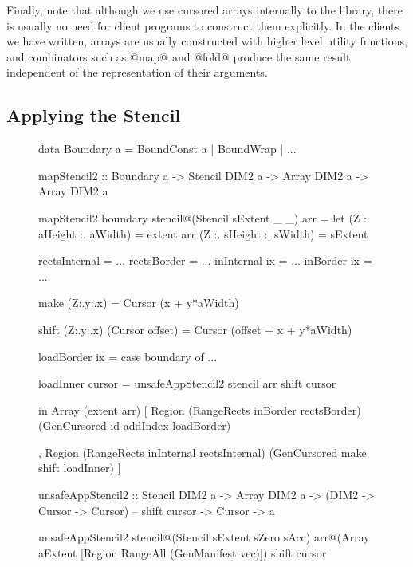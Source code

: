 Finally, note that although we use cursored arrays internally to the library, there is usually no need for client programs to construct them explicitly. In the clients we have written, arrays are usually constructed with higher level utility functions, and combinators such as @map@ and @fold@ produce the same result independent of the representation of their arguments.

\subsection{Applying the Stencil}
\label{sec:ApplyingTheStencil}

\begin{figure}

\begin{small}
\begin{code}
data Boundary a
      = BoundConst a
      | BoundWrap
      | ...
	
mapStencil2 
  :: Boundary a -> Stencil DIM2 a
  -> Array DIM2 a -> Array DIM2 a

mapStencil2 boundary stencil@(Stencil sExtent _ _) arr
 = let (Z :. aHeight :. aWidth) = extent arr
       (Z :. sHeight :. sWidth) = sExtent

       rectsInternal    = ...
       rectsBorder      = ...
       inInternal ix    = ...
       inBorder   ix    = ...

       make  (Z:.y:.x)
        = Cursor (x + y*aWidth)
	
       shift (Z:.y:.x) (Cursor offset)
        = Cursor (offset + x + y*aWidth)

       loadBorder ix    = case boundary of ...
			
       loadInner cursor
        = unsafeAppStencil2 stencil arr shift cursor
							
   in  Array (extent arr)
        [ Region (RangeRects inBorder rectsBorder)
                 (GenCursored id addIndex loadBorder) 

        , Region (RangeRects inInternal rectsInternal)
                 (GenCursored make shift loadInner) ]


unsafeAppStencil2
  :: Stencil DIM2 a -> Array DIM2 a 
  -> (DIM2 -> Cursor -> Cursor)       -- shift cursor
  -> Cursor -> a

unsafeAppStencil2
  stencil@(Stencil sExtent sZero sAcc)
  arr@(Array aExtent [Region RangeAll (GenManifest vec)])
  shift cursor
 

\end{code}
\end{small}
\end{figure}
